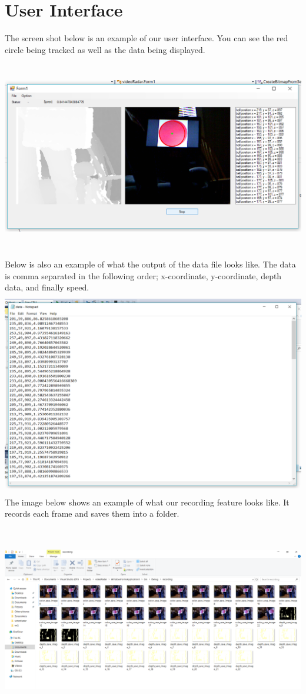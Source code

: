 \documentclass[onecolumn, draftclsnofoot,10pt, compsoc]{IEEEtran}
\begin{document}
\section{User Interface}
The screen shot below is an example of our user interface. You can see the red circle being tracked as well as the data being displayed.
\newline
\includegraphics[height=9cm]{ui}
\newline
Below is also an example of what the output of the data file looks like. The data is comma separated in the following order; x-coordinate, y-coordinate, depth data, and finally speed.
\newline
\includegraphics[height=9cm]{data}
\newline
The image below shows an example of what our recording feature looks like. It records each frame and saves them into a folder.
\newline
\newline
\includegraphics[height=9cm]{saving}
\end{document}
